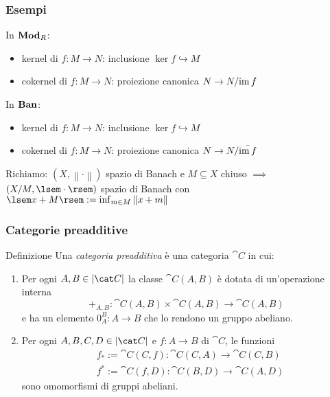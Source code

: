 \documentclass{beamer}
\begin{document}
\begin{frame}
  \frametitle{Esempi}
  In \(\mathbf{Mod}_R\):
  \begin{itemize}
  \item kernel di \(f : M \to N\): inclusione \(\ker f \hookrightarrow M\)
  \item cokernel di \(f : M \to N\): proiezione canonica
    \(N \to N{/}{\operatorname{im} f}\)
  \end{itemize}

  In \(\mathbf{Ban}\):
  \begin{itemize}
  \item kernel di \(f : M \to N\): inclusione \(\ker f \hookrightarrow M\)
  \item cokernel di \(f : M \to N\): proiezione canonica
    \(N \to N{/}{\bar{\operatorname{im} f}}\)
  \end{itemize}

  Richiamo: \((X, \left\lVert \cdot \right\rVert)\) spazio di Banach e
  \(M \subseteq X\) chiuso \(\implies\) \((X/M, \lsem \cdot \rsem)\) spazio di
  Banach con
  \(\lsem x+M \rsem := \inf_{m \in M} \left\lVert x+m \right\rVert\)
\end{frame}

\begin{frame}
  \frametitle{Categorie preadditive}

\begin{block}{Definizione}
  Una {\em categoria preadditiva} è una categoria \(\cat C\) in cui:
  \begin{enumerate}
  \item Per ogni \(A, B \in \obj{\cat C}\) la classe \(\cat C(A, B)\) è
    dotata di un'operazione interna
    \[
      +_{A,B} : \cat C (A, B) \times \cat C (A, B) \to \cat C (A, B)
    \]
    e ha un elemento \(0_A^B : A \to B\) che lo rendono un gruppo
    abeliano.
  \item Per ogni \(A, B, C, D \in \obj{\cat C}\) e \(f : A \to B\) di
    \(\cat C\), le funzioni
    \begin{align*}
      & f_\ast := \cat C(C, f) : \cat C(C, A) \to \cat C(C, B) \\
      & f^\ast := \cat C(f, D) : \cat C(B, D) \to \cat C(A, D)
    \end{align*}
    sono omomorfismi di gruppi abeliani.
  \end{enumerate}
\end{block}
  
\end{frame}
\end{document}
